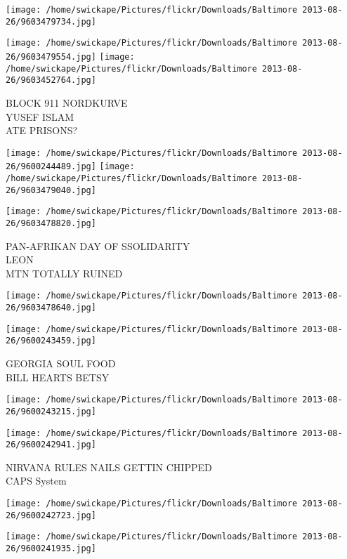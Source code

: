 \documentclass[10pt,letterpaper]{article}
\begin{document}
\texttt{[image: /home/swickape/Pictures/flickr/Downloads/Baltimore 2013-08-26/9603479734.jpg]}

\vspace{0.25in}
\texttt{[image: /home/swickape/Pictures/flickr/Downloads/Baltimore 2013-08-26/9603479554.jpg]}
\texttt{[image: /home/swickape/Pictures/flickr/Downloads/Baltimore 2013-08-26/9603452764.jpg]}

BLOCK 911 NORDKURVE\\
YUSEF ISLAM\\
ATE PRISONS?
\pagebreak

\texttt{[image: /home/swickape/Pictures/flickr/Downloads/Baltimore 2013-08-26/9600244489.jpg]}
\texttt{[image: /home/swickape/Pictures/flickr/Downloads/Baltimore 2013-08-26/9603479040.jpg]}

\texttt{[image: /home/swickape/Pictures/flickr/Downloads/Baltimore 2013-08-26/9603478820.jpg]}

PAN{-}AFRIKAN DAY OF SSOLIDARITY\\
LEON\\
MTN TOTALLY RUINED
\pagebreak

\texttt{[image: /home/swickape/Pictures/flickr/Downloads/Baltimore 2013-08-26/9603478640.jpg]}

\vspace{0.25in}
\texttt{[image: /home/swickape/Pictures/flickr/Downloads/Baltimore 2013-08-26/9600243459.jpg]}

GEORGIA SOUL FOOD\\
BILL HEARTS BETSY
\pagebreak

\texttt{[image: /home/swickape/Pictures/flickr/Downloads/Baltimore 2013-08-26/9600243215.jpg]}

\vspace{0.25in}
\texttt{[image: /home/swickape/Pictures/flickr/Downloads/Baltimore 2013-08-26/9600242941.jpg]}

NIRVANA RULES NAILS GETTIN CHIPPED\\
CAPS System
\pagebreak

\texttt{[image: /home/swickape/Pictures/flickr/Downloads/Baltimore 2013-08-26/9600242723.jpg]}

\vspace{0.25in}
\texttt{[image: /home/swickape/Pictures/flickr/Downloads/Baltimore 2013-08-26/9600241935.jpg]}
\end{document}
